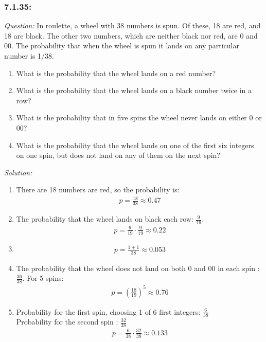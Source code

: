 \documentclass[a4paper]{article}
\begin{document}
\subsubsection*{7.1.35:}
\textit{Question:} In roulette, a wheel with 38 numbers is spun. Of these, 18 are red, and 18 are black. The other two numbers, which are neither black nor red, are 0 and 00. The probability that when the wheel is spun it lands on any particular number is 1/38.
\begin{enumerate}[label = (\alph*)]
	\item What is the probability that the wheel lands on a red number?
	\item What is the probability that the wheel lands on a black number twice in a row?
	\item What is the probability that in five spins the wheel never lands on either 0 or 00?
	\item What is the probability that the wheel lands on one of the first six integers on one spin, but does not land on any of them on the next spin?
\end{enumerate}
\textit{Solution:}
\begin{enumerate}[label = (\alph*)]
	\item There are 18 numbers are red, so the probability is:
	      \begin{align*}
		      p = \frac{18}{38} \approx 0.47
	      \end{align*}
	\item The probability that the wheel lands on black each row: $\frac{9}{19}$.
	      \begin{align*}
		      p = \frac{9}{19}\cdot\frac{9}{19} \approx 0.22
	      \end{align*}
	\item
	      \begin{align*}
		      p = \frac{1+1}{38} \approx 0.053
	      \end{align*}
	\item The probability that the wheel does not land on both 0 and 00 in each spin : $\frac{36}{38}$. For 5 spins:
	      \begin{align*}
		      p = (\frac{18}{19})^{5} \approx 0.76
	      \end{align*}
	\item Probability for the first spin, choosing 1 of 6 first integers: $\frac{6}{38}$ \\
	      Probability for the second spin : $\frac{32}{38}$
	      \begin{align*}
		      p = \frac{6}{38}\cdot\frac{32}{38} \approx 0.133
	      \end{align*}
\end{enumerate}
\end{document}
